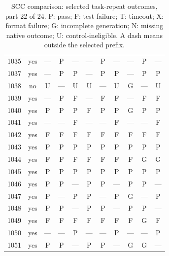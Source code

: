 \begin{table}[p]
\begin{tabular*}{\textwidth}{@{\extracolsep{\fill}}rc*{9}{c}@{}}
1035 & yes & — & P & — & — & P & — & — & P & —\\
1037 & yes & — & P & P & — & P & P & — & P & P\\
1038 & no & U & — & U & U & — & U & G & — & U\\
1039 & yes & — & F & F & — & F & F & — & F & F\\
1040 & yes & P & P & P & F & P & P & G & P & P\\
1041 & yes & — & — & F & — & — & F & — & — & F\\
1042 & yes & F & F & F & F & F & F & F & F & F\\
1043 & yes & P & P & P & P & P & P & P & P & P\\
1044 & yes & F & F & F & F & F & F & F & G & G\\
1045 & yes & P & P & P & P & P & P & P & P & P\\
1046 & yes & P & P & — & P & P & — & P & P & —\\
1047 & yes & P & — & P & P & — & P & G & — & P\\
1048 & yes & P & P & — & P & P & — & P & P & —\\
1049 & yes & F & F & F & F & F & F & F & G & F\\
1050 & yes & — & — & P & — & — & P & — & — & P\\
1051 & yes & P & P & — & P & P & — & G & G & —\\
\bottomrule\end{tabular*}
\caption{SCC comparison: selected task-repeat outcomes, part 22 of 24. P: pass; F: test failure; T: timeout; X: format failure; G: incomplete generation; N: missing native outcome; U: control-ineligible. A dash means outside the selected prefix.}
\end{table}
\clearpage
